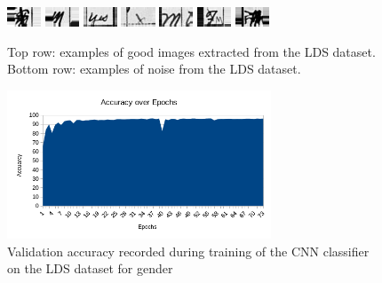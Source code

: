 \begin{figure}[h]
\begin{center}
    \\[1em]
      \includegraphics[width=0.09\textwidth]{images/Subimages/problematic/004531795_00275-72.png}
      \includegraphics[width=0.09\textwidth]{images/Subimages/problematic/004531795_00275-86.png}
      \includegraphics[width=0.09\textwidth]{images/Subimages/problematic/004531795_00276-2.png}
      \includegraphics[width=0.09\textwidth]{images/Subimages/problematic/004531795_00276-49.png}
      \includegraphics[width=0.09\textwidth]{images/Subimages/problematic/004531795_00605-8.png}
      \includegraphics[width=0.09\textwidth]{images/Subimages/problematic/004531795_00778-55.png}
      \includegraphics[width=0.09\textwidth]{images/Subimages/problematic/004531871_00823-56.png}
  \end{center}
  \caption{
    Top row: examples of good images extracted from the LDS dataset.
    Bottom row: examples of noise from the LDS dataset.
    }
  \label{fig:goodAndBad}
\end{figure}

\begin{figure}[h]
  \centering
  \includegraphics[width=0.7\textwidth]{images/AccuracyoverEpochslog7.png}
  \caption{
    Validation accuracy recorded during training of the CNN classifier on the
    LDS dataset for gender
    }
  \label{fig:valAccuracyDuringTraining}
\end{figure}




